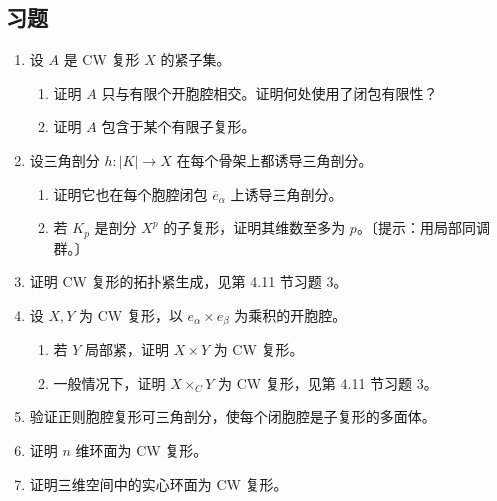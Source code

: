 \subsection*{习题}
\begin{enumerate}
\item 设 $A$ 是 CW 复形 $X$ 的紧子集。
\begin{enumerate}[label=(\alph*)]
\item 证明 $A$ 只与有限个开胞腔相交。证明何处使用了闭包有限性？
\item 证明 $A$ 包含于某个有限子复形。
\end{enumerate}
\item 设三角剖分 $h:|K|\to X$ 在每个骨架上都诱导三角剖分。
\begin{enumerate}[label=(\alph*)]
\item 证明它也在每个胞腔闭包 $\overline e_\alpha$ 上诱导三角剖分。
\item 若 $K_p$ 是剖分 $X^p$ 的子复形，证明其维数至多为 $p$。〔提示：用局部同调群。〕
\end{enumerate}
\item 证明 CW 复形的拓扑紧生成，见第 4.11 节习题 3。
\item 设 $X,Y$ 为 CW 复形，以 $e_\alpha\times e_\beta$ 为乘积的开胞腔。
\begin{enumerate}[label=(\alph*)]
\item 若 $Y$ 局部紧，证明 $X\times Y$ 为 CW 复形。
\item 一般情况下，证明 $X\times_CY$ 为 CW 复形，见第 4.11 节习题 3。
\end{enumerate}
\item 验证正则胞腔复形可三角剖分，使每个闭胞腔是子复形的多面体。
\item 证明 $n$ 维环面为 CW 复形。
\item 证明三维空间中的实心环面为 CW 复形。
\end{enumerate}
